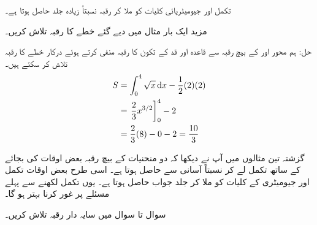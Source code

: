 تکمل اور جیومیٹریائی کلیات کو ملا کر رقبہ نسبتاً زیادہ جلد حاصل ہوتا ہے۔

مزید ایک بار مثال  میں دیے گئے خطے کا رقبہ تلاش کریں۔

حل:\quad
ہم  محور   اور  کے بیچ رقبہ سے قاعدہ  اور قد  کے تکون کا رقبہ منفی کرتے ہوئے درکار خطے کا رقبہ تلاش کر سکتے ہیں۔ 
\begin{align*}
S&=\int_0^4\sqrt{x}\dif x-\frac{1}{2}(2)(2)\\
&=\left. \frac{2}{3}x^{3/2}\right]_0^4-2\\
&=\frac{2}{3}(8)-0-2=\frac{10}{3}
\end{align*}

گزشتہ تین مثالوں میں آپ نے دیکھا کہ دو منحنیات کے بیچ رقبہ بعض اوقات  کی بجائے  کے ساتھ تکمل لے کر نسبتاً آسانی سے حاصل ہوتا ہے۔ اسی طرح بعض اوقات تکمل اور جیومیٹری کے کلیات کو ملا کر جلد جواب حاصل ہوتا ہے۔ یوں تکمل لکھنے سے پہلے مسئلے پر غور کرنا بہتر ہو گا۔


سوال  تا سوال  میں سایہ دار رقبہ تلاش کریں۔

